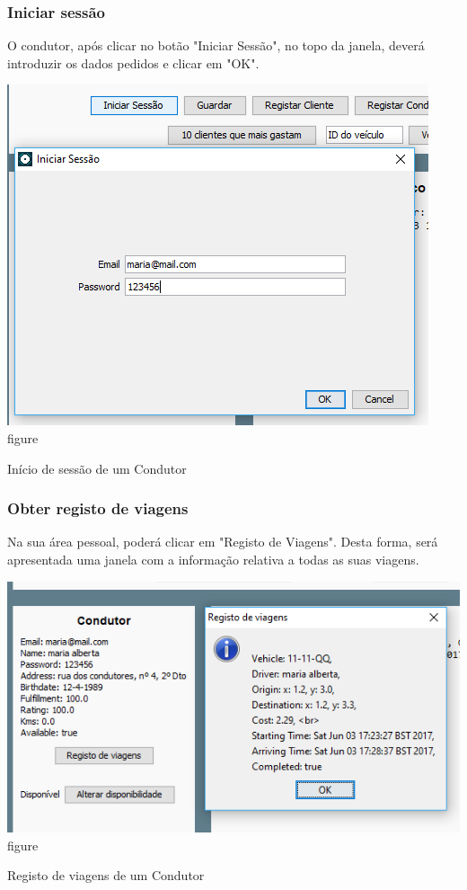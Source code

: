 \documentclass[a4paper]{article}
\begin{document}
\subsubsection{Iniciar sessão}
O condutor, após clicar no botão "Iniciar Sessão", no topo da janela, deverá introduzir os dados pedidos e clicar em "OK".
\begin{center}
  \includegraphics[scale=0.75]{cliente_iniciarsessao}\\
  \caption{figure}{Início de sessão de um Condutor}
  \label{fig:picture}
\end{center}
\subsubsection{Obter registo de viagens}
Na sua área pessoal, poderá clicar em "Registo de Viagens". Desta forma, será apresentada uma janela com a informação relativa a todas as suas viagens.
\begin{center}
  \includegraphics[scale=0.75]{condutor_registo}\\
  \caption{figure}{Registo de viagens de um Condutor}
  \label{fig:picture}
\end{center}
\end{document}
